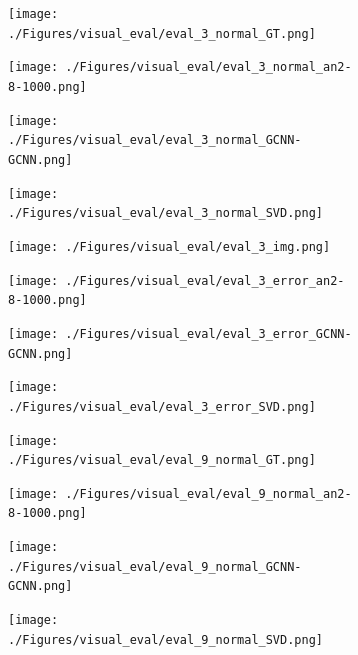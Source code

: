 \documentclass[border=15pt, multi, tikz]{article}
\begin{document}
\begin{figure}
	
	\begin{subfigure}[b]{0.24\linewidth}
		\texttt{[image: ./Figures/visual\_eval/eval\_3\_normal\_GT.png]}
	\end{subfigure}
	\begin{subfigure}[b]{0.24\linewidth}
		\texttt{[image: ./Figures/visual\_eval/eval\_3\_normal\_an2-8-1000.png]}
	\end{subfigure}
	\begin{subfigure}[b]{0.24\linewidth}
		\texttt{[image: ./Figures/visual\_eval/eval\_3\_normal\_GCNN-GCNN.png]}
	\end{subfigure}
	\begin{subfigure}[b]{0.24\linewidth}
		\texttt{[image: ./Figures/visual\_eval/eval\_3\_normal\_SVD.png]}
	\end{subfigure}
	
	\begin{subfigure}[b]{0.24\linewidth}
		\texttt{[image: ./Figures/visual\_eval/eval\_3\_img.png]}
	\end{subfigure}
	\begin{subfigure}[b]{0.24\linewidth}
		\texttt{[image: ./Figures/visual\_eval/eval\_3\_error\_an2-8-1000.png]}
	\end{subfigure}
	\begin{subfigure}[b]{0.24\linewidth}
		\texttt{[image: ./Figures/visual\_eval/eval\_3\_error\_GCNN-GCNN.png]}
	\end{subfigure}
	\begin{subfigure}[b]{0.24\linewidth}
		\texttt{[image: ./Figures/visual\_eval/eval\_3\_error\_SVD.png]}
	\end{subfigure}
	
	
	
	\begin{subfigure}[b]{0.24\linewidth}
		\texttt{[image: ./Figures/visual\_eval/eval\_9\_normal\_GT.png]}
	\end{subfigure}
	\begin{subfigure}[b]{0.24\linewidth}
		\texttt{[image: ./Figures/visual\_eval/eval\_9\_normal\_an2-8-1000.png]}
	\end{subfigure}
	\begin{subfigure}[b]{0.24\linewidth}
		\texttt{[image: ./Figures/visual\_eval/eval\_9\_normal\_GCNN-GCNN.png]}
	\end{subfigure}
	\begin{subfigure}[b]{0.24\linewidth}
		\texttt{[image: ./Figures/visual\_eval/eval\_9\_normal\_SVD.png]}
	\end{subfigure}
	

\end{figure}
\end{document}
